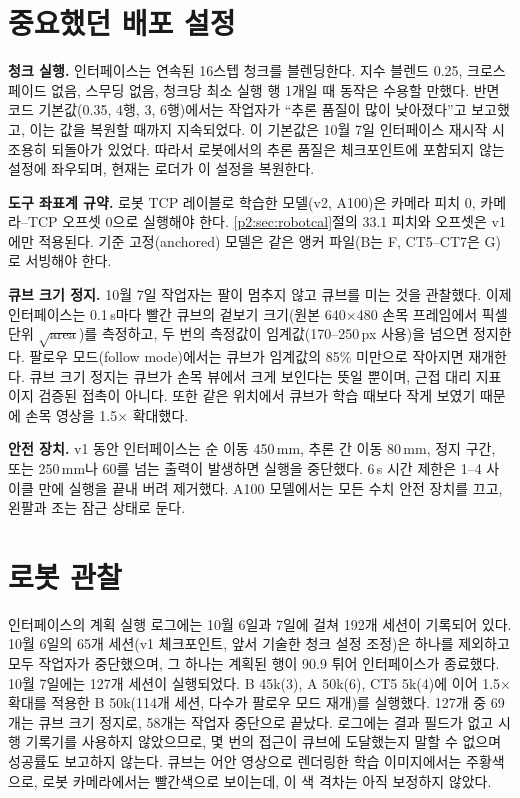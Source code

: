 \documentclass[conference,10pt]{IEEEtran}
\newcommand{\mm}{\,mm\xspace}
\begin{document}
\section{중요했던 배포 설정}\label{p2:sec:deploy}
\textbf{청크 실행.} 인터페이스는 연속된 16스텝 청크를 블렌딩한다. 지수 블렌드 0.25, 크로스페이드 없음, 스무딩 없음,
청크당 최소 실행 행 1개일 때 동작은 수용할 만했다. 반면 코드 기본값(0.35, 4행, 3\textdegree, 6행)에서는 작업자가
“추론 품질이 많이 낮아졌다”고 보고했고, 이는 값을 복원할 때까지 지속되었다. 이 기본값은 10월 7일 인터페이스 재시작 시
조용히 되돌아가 있었다. 따라서 로봇에서의 추론 품질은 체크포인트에 포함되지 않는 설정에 좌우되며, 현재는 로더가 이
설정을 복원한다.

\textbf{도구 좌표계 규약.} 로봇 TCP 레이블로 학습한 모델(v2, A100)은 카메라 피치 0, 카메라--TCP 오프셋 0으로 실행해야 한다.
\ref{p2:sec:robotcal}절의 33.1\textdegree{} 피치와 오프셋은 v1에만 적용된다. 기준 고정(anchored) 모델은 같은 앵커 파일(B는
F, CT5--CT7은 G)로 서빙해야 한다.

\textbf{큐브 크기 정지.} 10월 7일 작업자는 팔이 멈추지 않고 큐브를 미는 것을 관찰했다. 이제 인터페이스는 0.1\,s마다 빨간
큐브의 겉보기 크기(원본 640$\times$480 손목 프레임에서 픽셀 단위 $\sqrt{\text{area}}$)를 측정하고, 두 번의 측정값이
임계값(170--250\,px 사용)을 넘으면 정지한다. 팔로우 모드(follow mode)에서는 큐브가 임계값의 85\% 미만으로 작아지면 재개한다.
큐브 크기 정지는 큐브가 손목 뷰에서 크게 보인다는 뜻일 뿐이며, 근접 대리 지표이지 검증된 접촉이 아니다. 또한 같은 위치에서
큐브가 학습 때보다 작게 보였기 때문에 손목 영상을 1.5$\times$ 확대했다.

\textbf{안전 장치.} v1 동안 인터페이스는 순 이동 450\mm, 추론 간 이동 80\mm, 정지 구간, 또는 250\mm{}나
60\textdegree{}를 넘는 출력이 발생하면 실행을 중단했다. 6\,s 시간 제한은 1--4 사이클 만에 실행을 끝내 버려 제거했다.
A100 모델에서는 모든 수치 안전 장치를 끄고, 왼팔과 조는 잠근 상태로 둔다.

\section{로봇 관찰}\label{p2:sec:robot}
인터페이스의 계획 실행 로그에는 10월 6일과 7일에 걸쳐 192개 세션이 기록되어 있다. 10월 6일의 65개 세션(v1 체크포인트,
앞서 기술한 청크 설정 조정)은 하나를 제외하고 모두 작업자가 중단했으며, 그 하나는 계획된 행이 90.9\textdegree{} 튀어
인터페이스가 종료했다. 10월 7일에는 127개 세션이 실행되었다. B 45k(3), A 50k(6), CT5 5k(4)에 이어 1.5$\times$ 확대를
적용한 B 50k(114개 세션, 다수가 팔로우 모드 재개)를 실행했다. 127개 중 69개는 큐브 크기 정지로, 58개는 작업자 중단으로
끝났다. 로그에는 결과 필드가 없고 시행 기록기를 사용하지 않았으므로, 몇 번의 접근이 큐브에 도달했는지 말할 수 없으며
성공률도 보고하지 않는다. 큐브는 어안 영상으로 렌더링한 학습 이미지에서는 주황색으로, 로봇 카메라에서는 빨간색으로 보이는데,
이 색 격차는 아직 보정하지 않았다.
\end{document}
